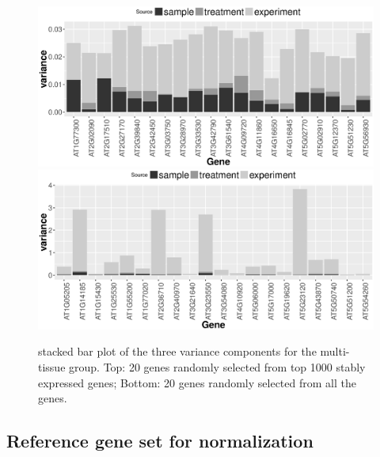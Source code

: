 \documentclass[11pt, a4paper]{article}
\begin{document}
\begin{figure}[!h]
	\centering
	\includegraphics[width=0.8\linewidth]{Figures/top1000.eps}
	\includegraphics[width=0.8\linewidth]{Figures/all.eps}
	\caption{stacked bar plot of the three variance components for the multi-tissue group. Top: 20 genes randomly selected from top 1000 stably expressed genes; Bottom: 20 genes randomly selected from all the genes.}
	\label{fig:all}
\end{figure}


\subsection{Reference gene set for normalization}
\label{Section:commonReference}
\end{document}
